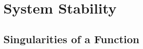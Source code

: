 \setchapterpreamble[u]{\margintoc}
\chapter[System Stability ($4^{th}$ Lecture)]{System Stability}

\section{Singularities of a Function}

\blindtext


